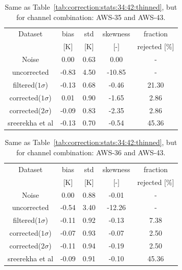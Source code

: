 \documentclass[12pt]{article}
\begin{document}
\begin{table}[!p]
	\centering
	\begin{tabular}[b]{c|c|c|c|c}
		Dataset  		  &   bias &   std &   skewness & fraction \\
		&   [K]  &   [K] & [-] & rejected [\%]\\
		\hline
		Noise           	  &  0.00 &  0.63 &               0.00 &                -\\
		uncorrected     	  &  -0.83 &  4.50 &             -10.85 &                - \\
		filtered($1\sigma$)	  &  -0.13 &  0.68 &              -0.46 &               21.30 \\
		corrected($1\sigma$)  &   0.01 &  0.90 &              -1.65 &                2.86 \\
		corrected($2\sigma$)  &  -0.09 &  0.83 &              -2.35 &                2.86 \\
		sreerekha et al  	  &  -0.13 &  0.70 &              -0.54 &               45.36 \\
		\hline
	\end{tabular}
	\caption{Same as Table~\ref{tab:correction:stats:34:42:thinned}, but for channel combination: AWS-35 and AWS-43.}
	\label{tab:correction:stats:35:43}
\end{table}

\begin{table}[!p]
	\centering
	\begin{tabular}[b]{c|c|c|c|c}
		Dataset  		  &   bias &   std &   skewness & fraction  \\
		&   [K]  &   [K] & [-] & rejected [\%]\\
		\hline
		Noise            	 &  0.00 &  0.88 &              -0.01 &               - \\
		uncorrected      	 &  -0.54 &  3.40 &             -12.26 &                - \\
		filtered($1\sigma$)  &  -0.11 &  0.92 &              -0.13 &                7.38 \\
		corrected($1\sigma$) &  -0.07 &  0.93 &              -0.07 &                2.50 \\
		corrected($2\sigma$) &  -0.11 &  0.94 &              -0.19 &                2.50 \\
		sreerekha et al 	 &  -0.09 &  0.91 &              -0.10 &               45.36 \\
		\hline
	\end{tabular}
	\caption{Same as Table~\ref{tab:correction:stats:34:42:thinned}, but for channel combination: AWS-36 and AWS-43.   }
	\label{tab:correction:stats:36:43}
\end{table}
\end{document}
